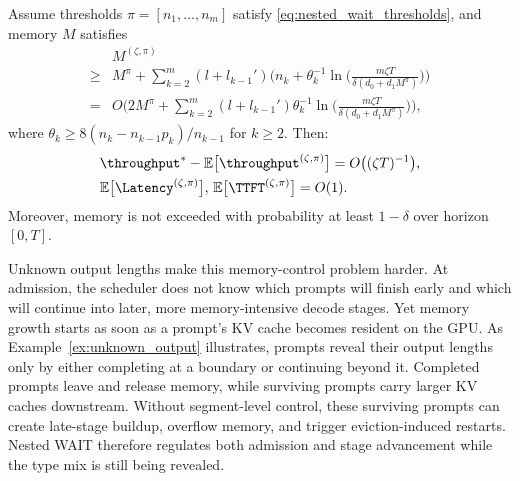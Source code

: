 \begin{theorem}
\label{thm:nested_wait_heavy_traffic}
Assume thresholds \( \pi = [n_1, \dots, n_m] \) satisfy \eqref{eq:nested_wait_thresholds}, and memory \( M \) satisfies
\begin{equation}
    \label{eq:nested_wait_memory_total}
\begin{aligned}
    &M^{(\zeta,\pi)}\\
\geq &M^\pi + \sum_{k=2}^m (l + l_{k-1}') \bigg(n_k + \theta_k^{-1} \ln\Big( \frac{m \zeta T}{\delta(d_0+d_1M^\pi)} \Big)\bigg) \\
=& O\bigg( 2M^\pi + \sum_{k=2}^m (l + l_{k-1}') \theta_k^{-1}\ln\Big( \frac{m \zeta T}{\delta(d_0+d_1M^\pi)} \Big) \bigg),
\end{aligned}
\end{equation}
where $\theta_k \geq 8(n_k - n_{k-1}p_k)/n_{k-1}$ for \(k\ge 2\). Then:
$$
    \begin{aligned}
        &\throughput^* - \mathbb{E}\big[ \throughput^{(\zeta, \pi)} \big] 
   = O\big( (\zeta T)^{-1} \big), \\
&\mathbb{E}\big[ \Latency^{(\zeta, \pi)} \big],\,\mathbb{E}\big[ \TTFT^{(\zeta, \pi)} \big] = O(1).
    \end{aligned}
$$
Moreover, memory is not exceeded with probability at least \(1-\delta\) over horizon \([0,T]\).
\end{theorem}

Unknown output lengths make this memory-control problem harder. At admission, the scheduler does not know which prompts will finish early and which will continue into later, more memory-intensive decode stages. Yet memory growth starts as soon as a prompt's KV cache becomes resident on the GPU. As Example~\ref{ex:unknown_output} illustrates, prompts reveal their output lengths only by either completing at a boundary or continuing beyond it. Completed prompts leave and release memory, while surviving prompts carry larger KV caches downstream. Without segment-level control, these surviving prompts can create late-stage buildup, overflow memory, and trigger eviction-induced restarts. Nested WAIT therefore regulates both admission and stage advancement while the type mix is still being revealed.

